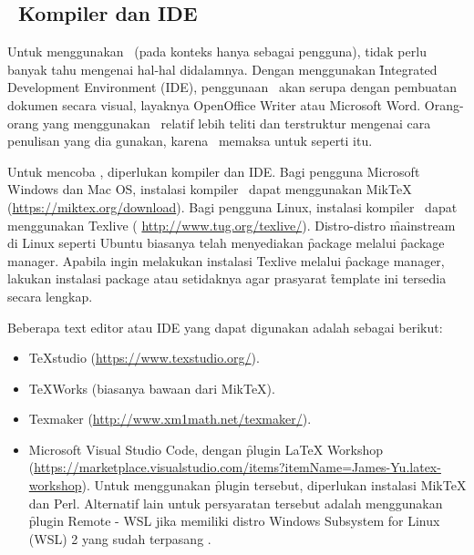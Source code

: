 \subsection{\latex~Kompiler dan IDE}
\label{sec:latexCompiler}
Untuk menggunakan \latex~(pada konteks hanya sebagai pengguna), tidak perlu banyak tahu mengenai hal-hal didalamnya.
Dengan menggunakan \f{Integrated Development Environment} (IDE), penggunaan \latex~akan serupa dengan pembuatan dokumen secara visual, layaknya OpenOffice Writer atau Microsoft Word.
Orang-orang yang menggunakan \latex~relatif lebih teliti dan terstruktur mengenai cara penulisan yang dia gunakan, karena \latex~memaksa untuk seperti itu.

Untuk mencoba \latex, diperlukan kompiler dan IDE.
Bagi pengguna Microsoft Windows dan Mac OS, instalasi kompiler \latex~dapat menggunakan MikTeX (\url{https://miktex.org/download}).
Bagi pengguna Linux, instalasi kompiler \latex~dapat menggunakan Texlive ( \url{http://www.tug.org/texlive/}).
Distro-distro \f{mainstream} di Linux seperti Ubuntu biasanya telah menyediakan \f{package}  melalui \f{package manager}.
Apabila ingin melakukan instalasi Texlive melalui \f{package manager}, lakukan instalasi package  atau setidaknya  agar prasyarat \f{template} ini tersedia secara lengkap.

Beberapa text editor atau IDE yang dapat digunakan adalah sebagai berikut:
\begin{itemize}
	\item TeXstudio (\url{https://www.texstudio.org/}).
	\item TeXWorks (biasanya bawaan dari MikTeX).
	\item Texmaker (\url{http://www.xm1math.net/texmaker/}).
	\item Microsoft Visual Studio Code, dengan \f{plugin} LaTeX Workshop (\url{https://marketplace.visualstudio.com/items?itemName=James-Yu.latex-workshop}). Untuk menggunakan \f{plugin} tersebut, diperlukan instalasi MikTeX dan Perl. Alternatif lain untuk persyaratan tersebut adalah menggunakan \f{plugin} Remote - WSL jika memiliki distro Windows Subsystem for Linux (WSL) 2 yang sudah terpasang .
\end{itemize}


